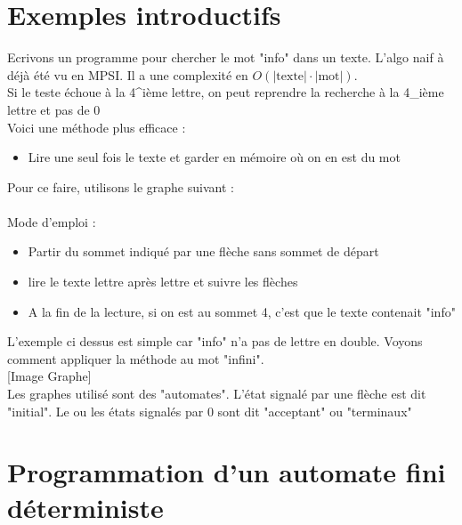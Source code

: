 
	\maketitle

    \section{Exemples introductifs}
    Ecrivons un programme pour chercher le mot "info" dans un texte. L'algo naif à déjà été vu en MPSI.
    Il a une complexité en $O(|\text{texte}|\cdot |\text{mot|})$. \\

    Si le teste échoue à la 4^{ième} lettre, on peut reprendre la recherche à la 4_{ième} lettre 
    et pas de 0 \\

    Voici une méthode plus efficace : \\
    \begin{itemize}
        \item Lire une seul fois le texte et garder en mémoire où on en est du mot
    \end{itemize}

    Pour ce faire, utilisons le graphe suivant : \\
    [Image graphe]\\

    Mode d'emploi :
    \begin{itemize}
        \item Partir du sommet indiqué par une flèche sans sommet de départ
        \item lire le texte lettre après lettre et suivre les flèches
        \item A la fin de la lecture, si on est au sommet 4, c'est que le texte contenait "info"
    \end{itemize}

    L'exemple ci dessus est simple car "info" n'a pas de lettre en double. Voyons comment appliquer la méthode au mot "infini".\\

    [Image Graphe]\\

    Les graphes utilisé sont des "automates". L'état signalé par une flèche est dit "initial". Le ou les 
    états signalés par 0 sont dit "acceptant" ou "terminaux"

    \section{Programmation d'un automate fini déterministe}

